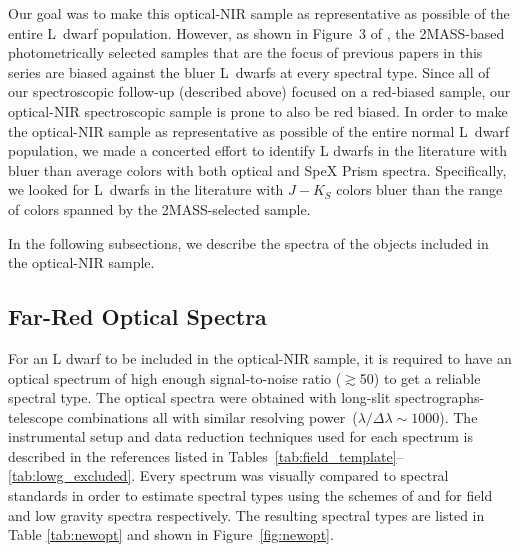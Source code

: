 \documentclass[12pt,preprint]{aastex}
\begin{document}
Our goal was to make this optical-NIR sample as representative as possible of the entire L~dwarf population. 
However, as shown in Figure~3 of \cite{Schmidt10}, the 2MASS-based photometrically selected samples that are the focus of previous papers in this series \citep{Cruz03, Reid08} are biased against the bluer L~dwarfs at every spectral type. 
Since all of our spectroscopic follow-up (described above) focused on a red-biased sample, our optical-NIR spectroscopic sample is prone to also be red biased. 
In order to make the optical-NIR sample as representative as possible of the entire normal L~dwarf population, we made a concerted effort to identify L dwarfs in the literature with bluer than average colors with both optical and SpeX Prism spectra.
Specifically, we looked for L~dwarfs in the literature with $J-K_S$ colors bluer than the range of colors spanned by the 2MASS-selected sample. 

In the following subsections, we describe the spectra of the objects included in the optical-NIR sample.

\subsection{Far-Red Optical Spectra}

For an L dwarf to be included in the optical-NIR sample, it is required to have an optical spectrum of high enough signal-to-noise ratio ($\gtrsim$50) to get a reliable spectral type.
The optical spectra were obtained with long-slit spectrographs-telescope combinations all with similar resolving power~($\lambda/\Delta\lambda\sim1000$). 
The instrumental setup and data reduction techniques used for each spectrum is described in the references listed in Tables~\ref{tab:field_template}--\ref{tab:lowg_excluded}.
Every spectrum was visually compared to spectral standards in order to estimate spectral types using the schemes of \citet{K99} and \cite{Cruz09_lowg} for field and low gravity spectra respectively.  The resulting spectral types are listed in Table \ref{tab:newopt} and shown in Figure~\ref{fig:newopt}.

\end{document}

